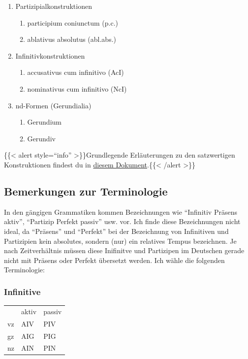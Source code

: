 \documentclass{scrartcl}
\begin{document}
\begin{enumerate}
\item Partizipialkonstruktionen
\begin{enumerate}
\item participium coniunctum (p.c.)
\item ablativus absolutus (abl.abs.)
\end{enumerate}
\item Infinitivkonstruktionen
\begin{enumerate}
\item accusativus cum infinitivo (AcI)
\item nominativus cum infinitivo (NcI)
\end{enumerate}
\item nd-Formen (Gerundialia)
\begin{enumerate}
\item Gerundium
\item Gerundiv
\end{enumerate}
\end{enumerate}


\{\{< alert style="`info"' >\}\}Grundlegende Erläuterungen zu den satzwertigen Konstruktionen findest du in \href{https://www.dropbox.com/s/k0ti2cgg8m66et7/Satzwertige\_Konstruktionen.pdf?dl=0}{diesem Dokument}.\{\{< /alert >\}\}

\subsection{Bemerkungen zur Terminologie}
\label{sec:orge35db90}

In den gängigen Grammatiken kommen Bezeichnungen wie "`Infinitiv Präsens aktiv"', "`Partizip Perfekt passiv"' usw. vor. Ich finde diese Bezeichnungen nicht ideal, da "`Präsens"' und "`Perfekt"' bei der Bezeichnung von Infinitiven und Partizipien kein absolutes, sondern (nur) ein relatives Tempus bezeichnen. Je nach Zeitverhältnis müssen diese Inifinitve und Partizipen im Deutschen gerade nicht mit Präsens oder Perfekt übersetzt werden. Ich wähle die folgenden Terminologie:

\subsubsection{Infinitive}
\label{sec:org8be1015}

\begin{center}
\begin{tabular}{lll}
 & aktiv & passiv\\
vz & AIV & PIV\\
gz & AIG & PIG\\
nz & AIN & PIN\\
\end{tabular}
\end{center}
\end{document}

